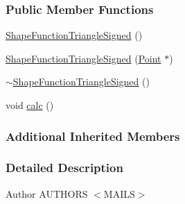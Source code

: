 \subsubsection*{Public Member Functions}
\begin{DoxyCompactItemize}
\item 
\hyperlink{classmknix_1_1_shape_function_triangle_signed_a61cfb35f68b96b8f3bed2527ca346537}{Shape\-Function\-Triangle\-Signed} ()
\item 
\hyperlink{classmknix_1_1_shape_function_triangle_signed_ae494b0d1f44b82afd93a91616fb8f216}{Shape\-Function\-Triangle\-Signed} (\hyperlink{classmknix_1_1_point}{Point} $\ast$)
\item 
\hyperlink{classmknix_1_1_shape_function_triangle_signed_acf9337e7665af9d12d72240c19880cb0}{$\sim$\-Shape\-Function\-Triangle\-Signed} ()
\item 
void \hyperlink{classmknix_1_1_shape_function_triangle_signed_a2dd45be9fb2789ac1579f1104c731c3d}{calc} ()
\end{DoxyCompactItemize}
\subsubsection*{Additional Inherited Members}


\subsubsection{Detailed Description}
\begin{DoxyAuthor}{Author}
A\-U\-T\-H\-O\-R\-S $<$\-M\-A\-I\-L\-S$>$ 
\end{DoxyAuthor}


